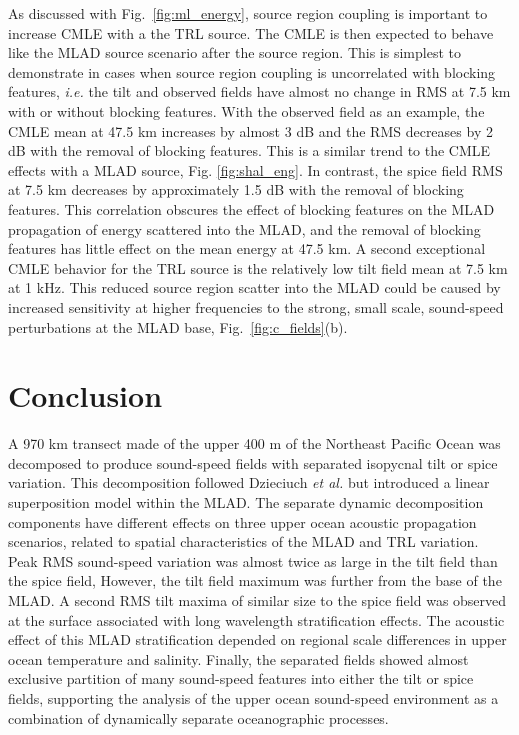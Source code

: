 \documentclass[preprint,NumberedRefs]{JASA}
\begin{document}
As discussed with Fig.~\ref{fig:ml_energy}, source region coupling is important to increase CMLE with a the TRL source. The CMLE is then expected to behave like the MLAD source scenario after the source region. This is simplest to demonstrate in cases when source region coupling is uncorrelated with blocking features, \emph{i.e.} the tilt and observed fields have almost no change in RMS at 7.5 km with or without blocking features. With the observed field as an example, the CMLE mean at 47.5 km increases by almost 3 dB and the RMS decreases by 2 dB with the removal of blocking features. This is a similar trend to the CMLE effects with a MLAD source, Fig. \ref{fig:shal_eng}. In contrast, the spice field RMS at 7.5 km decreases by approximately 1.5 dB with the removal of blocking features. This correlation obscures the effect of blocking features on the MLAD propagation of energy scattered into the MLAD, and the removal of blocking features has little effect on the mean energy at 47.5 km. A second exceptional CMLE behavior for the TRL source is the relatively low tilt field mean at 7.5 km at 1 kHz. This reduced source region scatter into the MLAD could be caused by increased sensitivity at higher frequencies to the strong, small scale, sound-speed perturbations at the MLAD base, Fig.~\ref{fig:c_fields}(b).

\section{Conclusion}\label{sec:conclusion}
A 970 km transect made of the upper 400 m of the Northeast Pacific Ocean was decomposed to produce sound-speed fields with separated isopycnal tilt or spice variation. This decomposition followed Dzieciuch \emph{et al.}\citep{dzieciuch2004} but introduced a linear superposition model within the MLAD. The separate dynamic decomposition components have different effects on three upper ocean acoustic propagation scenarios, related to spatial characteristics of the MLAD and TRL variation. Peak RMS sound-speed variation was almost twice as large in the tilt field than the spice field, However, the tilt field maximum was further from the base of the MLAD. A second RMS tilt maxima of similar size to the spice field was observed at the surface associated with long wavelength stratification effects. The acoustic effect of this MLAD stratification depended on regional scale differences in upper ocean temperature and salinity. Finally, the separated fields showed almost exclusive partition of many sound-speed features into either the tilt or spice fields, supporting the analysis of the upper ocean sound-speed environment as a combination of dynamically separate oceanographic processes.
\end{document}
